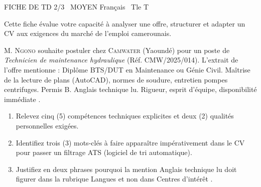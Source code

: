 \documentclass[11pt]{article}
\begin{document}
\begin{tcolorbox}[enhanced,colback=popink,colframe=popink,arc=10pt,boxrule=0pt,left=12pt,right=12pt,top=9pt,bottom=9pt]
{\color{white}\popxbold\small FICHE DE TD 2/3 \textbullet\ MOYEN \hfill Français \textbullet\ Tle T\par}
\end{tcolorbox}
\vspace{4pt}
Cette fiche évalue votre capacité à analyser une offre, structurer et adapter un CV aux exigences du marché de l'emploi camerounais.

\begin{exercice}
M. \textsc{Ngono} souhaite postuler chez \textsc{Camwater} (Yaoundé) pour un poste de \textit{Technicien de maintenance hydraulique} (Réf. CMW/2025/014). L'extrait de l'offre mentionne : \og Diplôme BTS/DUT en Maintenance ou Génie Civil. Maîtrise de la lecture de plans (AutoCAD), normes de soudure, entretien pompes centrifuges. Permis B. Anglais technique lu. Rigueur, esprit d'équipe, disponibilité immédiate \fg{}.
\begin{enumerate}
    \item Relevez cinq (5) compétences techniques explicites et deux (2) qualités personnelles exigées.
    \item Identifiez trois (3) mots-clés à faire apparaître impérativement dans le CV pour passer un filtrage ATS (logiciel de tri automatique).
    \item Justifiez en deux phrases pourquoi la mention \og Anglais technique lu \fg{} doit figurer dans la rubrique \og Langues \fg{} et non dans \og Centres d'intérêt \fg{}.
\end{enumerate}
\end{exercice}
\end{document}

